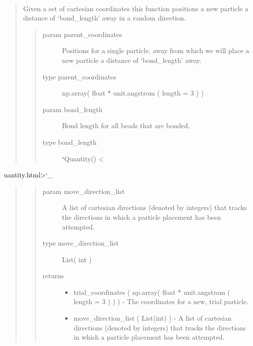 \documentclass[letterpaper,12pt,english,openany,oneside]{sphinxmanual}
\begin{document}
\begin{fulllineitems}
\label{\detokenize{utilities:utilities.util.attempt_lattice_move}}~\begin{quote}

Given a set of cartesian coordinates this function positions a new particle a distance of ‘bond\_length’ away in a random direction.
\begin{quote}\begin{description}
\item[{param parent\_coordinates}] \leavevmode
Positions for a single particle, away from which we will place a new particle a distance of ‘bond\_length’ away.

\item[{type parent\_coordinates}] \leavevmode
np.array( float * unit.angstrom ( length = 3 ) )

\item[{param bond\_length}] \leavevmode
Bond length for all beads that are bonded.

\item[{type bond\_length}] \leavevmode
{\color{red}\bfseries{}{}`}Quantity() \textless{}

\end{description}\end{quote}
\end{quote}

uantity.html\textgreater{}{}`\_
\begin{quote}
\begin{quote}\begin{description}
\item[{param move\_direction\_list}] \leavevmode
A list of cartesian directions (denoted by integers) that tracks the directions in which a particle placement has been attempted.

\item[{type move\_direction\_list}] \leavevmode
List( int )

\item[{returns}] \leavevmode\begin{itemize}
\item {} 
trial\_coordinates ( np.array( float * unit.angstrom ( length = 3 ) ) ) - The coordinates for a new, trial particle.

\item {} 
move\_direction\_list ( List(int) ) - A list of cartesian directions (denoted by integers) that tracks the directions in which a particle placement has been attempted.

\end{itemize}

\end{description}\end{quote}
\end{quote}

\end{fulllineitems}
\end{document}
